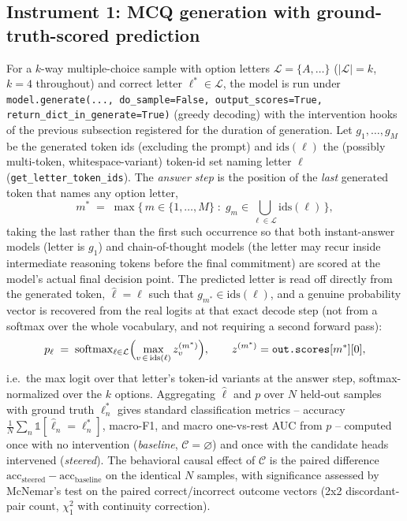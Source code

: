 \subsection{Instrument 1: MCQ generation with ground-truth-scored prediction}

For a $k$-way multiple-choice sample with option letters
$\mathcal{L} = \{A,\dots\}$ ($|\mathcal{L}|=k$, $k{=}4$ throughout) and
correct letter $\ell^{*} \in \mathcal{L}$, the model is run under
\texttt{model.generate(..., do\_sample=False, output\_scores=True,
return\_dict\_in\_generate=True)} (greedy decoding) with the intervention
hooks of the previous subsection registered for the duration of generation.
Let $g_1,\dots,g_M$ be the generated token ids (excluding the prompt) and
$\text{ids}(\ell)$ the (possibly multi-token, whitespace-variant) token-id
set naming letter $\ell$ (\texttt{get\_letter\_token\_ids}). The
\emph{answer step} is the position of the \emph{last} generated token that
names any option letter,
\[
  m^{*} \;=\; \max\bigl\{\, m \in \{1,\dots,M\} \;:\; g_m \in \textstyle\bigcup_{\ell \in \mathcal{L}} \text{ids}(\ell) \,\bigr\},
\]
taking the last rather than the first such occurrence so that both
instant-answer models (letter is $g_1$) and chain-of-thought models (the
letter may recur inside intermediate reasoning tokens before the final
commitment) are scored at the model's actual final decision point. The
predicted letter is read off directly from the generated token,
$\hat\ell = \ell$ such that $g_{m^{*}} \in \text{ids}(\ell)$, and a genuine
probability vector is recovered from the real logits at that exact decode
step (not from a softmax over the whole vocabulary, and not requiring a
second forward pass):
\[
  p_\ell \;=\; \operatorname{softmax}_{\ell \in \mathcal{L}}
  \Bigl(\max_{v \,\in\, \text{ids}(\ell)} z^{(m^{*})}_v\Bigr),
  \qquad
  z^{(m^{*})} = \texttt{out.scores}[m^{*}][0],
\]
i.e.\ the max logit over that letter's token-id variants at the answer
step, softmax-normalized over the $k$ options. Aggregating $\hat\ell$ and
$p$ over $N$ held-out samples with ground truth $\ell^{*}_n$ gives standard
classification metrics -- accuracy $\frac{1}{N}\sum_n
\mathbb{1}[\hat\ell_n = \ell^{*}_n]$, macro-F1, and macro one-vs-rest AUC
from $p$ -- computed once with no intervention (\emph{baseline}, $\mathcal{C}
= \varnothing$) and once with the candidate heads intervened
(\emph{steered}). The behavioral causal effect of $\mathcal{C}$ is the
paired difference $\text{acc}_{\text{steered}} - \text{acc}_{\text{baseline}}$
on the identical $N$ samples, with significance assessed by McNemar's test
on the paired correct/incorrect outcome vectors (2x2 discordant-pair count,
$\chi^2_1$ with continuity correction).

